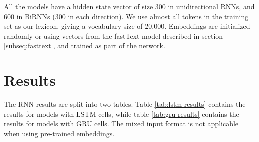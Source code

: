 All the models have a hidden state vector of size 300 in unidirectional
\acp{RNN}, and 600 in BiRNNs (300 in each direction). We use almost all
tokens in the training set as our lexicon, giving a vocabulary size of
20,000. Embeddings are initialized randomly or using vectors from the
fastText model described in section \ref{subseq:fasttext}, and trained as
part of the network.


\section{Results}

The RNN results are split into two tables. Table \ref{tab:lstm-results}
contains the results for models with \ac{LSTM} cells, while table
\ref{tab:gru-results} contains the results for models with \ac{GRU} cells.
The mixed input format is not applicable when using pre-trained embeddings.

